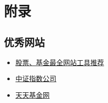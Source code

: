 \chapter{附录}

\section{优秀网站}\label{sec:website}

\begin{itemize}
    \item \href{https://zhuanlan.zhihu.com/p/180240411}{股票、基金最全网站工具推荐}
    \item \href{https://csindex.com.cn/}{中证指数公司}
    \item \href{https://fund.eastmoney.com/}{天天基金网}
\end{itemize}
